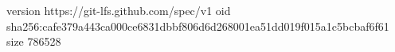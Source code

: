 version https://git-lfs.github.com/spec/v1
oid sha256:cafe379a443ca000ce6831dbbf806d6d268001ea51dd019f015a1c5bcbaf6f61
size 786528
